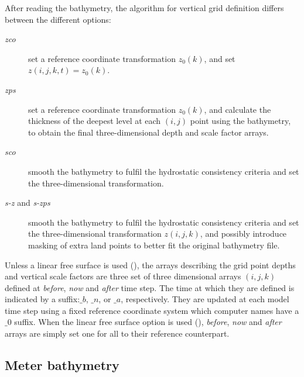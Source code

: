 \documentclass[../tex_main/NEMO_manual]{subfiles}
\begin{document}
After reading the bathymetry, the algorithm for vertical grid definition differs between the different options:
\begin{description}
\item[\textit{zco}]
  set a reference coordinate transformation $z_0 (k)$, and set $z(i,j,k,t)=z_0 (k)$.
\item[\textit{zps}]
  set a reference coordinate transformation $z_0 (k)$,
  and calculate the thickness of the deepest level at each $(i,j)$ point using the bathymetry,
  to obtain the final three-dimensional depth and scale factor arrays.
\item[\textit{sco}]
  smooth the bathymetry to fulfil the hydrostatic consistency criteria and
  set the three-dimensional transformation.
\item[\textit{s-z} and \textit{s-zps}]
  smooth the bathymetry to fulfil the hydrostatic consistency criteria and
  set the three-dimensional transformation $z(i,j,k)$,
  and possibly introduce masking of extra land points to better fit the original bathymetry file.
\end{description}

Unless a linear free surface is used (),
the arrays describing the grid point depths and vertical scale factors are three set of
three dimensional arrays $(i,j,k)$ defined at \textit{before}, \textit{now} and \textit{after} time step.
The time at which they are defined is indicated by a suffix:$\_b$, $\_n$, or $\_a$, respectively.
They are updated at each model time step using a fixed reference coordinate system which
computer names have a $\_0$ suffix.
When the linear free surface option is used (),
\textit{before}, \textit{now} and \textit{after} arrays are simply set one for all to their reference counterpart. 


\subsection{Meter bathymetry}
\label{subsec:DOM_bathy}
\end{document}
